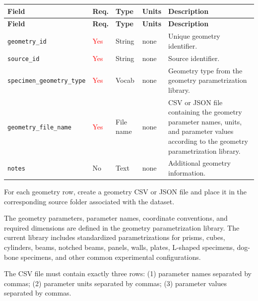 \documentclass[11pt]{book}
\begin{document}
\begin{longtable}{>{\raggedright\arraybackslash}p{}
                  >{\raggedright\arraybackslash}p{}
                  >{\raggedright\arraybackslash}p{}
                  >{\raggedright\arraybackslash}p{}
                  >{\raggedright\arraybackslash}p{}}
\hline
\textbf{Field} &
\textbf{Req.} &
\textbf{Type} &
\textbf{Units} &
\textbf{Description} \\
\hline
\endfirsthead

\hline
\textbf{Field} &
\textbf{Req.} &
\textbf{Type} &
\textbf{Units} &
\textbf{Description} \\
\hline
\endhead

\texttt{geometry\_id} & \textcolor{red}{Yes} & String & none & Unique geometry identifier. \\

\texttt{source\_id} & \textcolor{red}{Yes} & String & none & Source identifier. \\

\texttt{specimen\_geometry\_type} & \textcolor{red}{Yes} & Vocab & none & Geometry type from the geometry parametrization library. \\

\texttt{geometry\_file\_name} & \textcolor{red}{Yes} & File name & none & CSV or JSON file containing the geometry parameter names, units, and parameter values according to the geometry parametrization library. \\

\texttt{notes} &
No &
Text &
none &
Additional geometry information. \\


\hline
\end{longtable}

For each geometry row, create a geometry CSV or JSON file and place it in the corresponding source folder associated with the dataset.


The geometry parameters, parameter names, coordinate conventions, and required dimensions are defined in the geometry parametrization library. The current library includes standardized parametrizations for prisms, cubes, cylinders, beams, notched beams, panels, walls, plates, L-shaped specimens, dog-bone specimens, and other common experimental configurations.


The CSV file must contain exactly three rows: (1) parameter names separated by commas; (2) parameter units separated by commas; (3) parameter values separated by commas.
\end{document}
